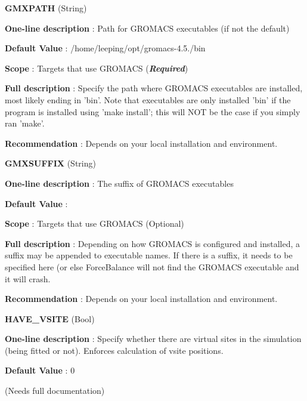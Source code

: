 \begin{DoxyItemize}
\item {\bfseries  \-G\-M\-X\-P\-A\-T\-H } (\-String) \par
{\bfseries  \-One-\/line description }\-: \-Path for \-G\-R\-O\-M\-A\-C\-S executables (if not the default) \par
{\bfseries  \-Default \-Value }\-: /home/leeping/opt/gromacs-\/4.5./bin \par
{\bfseries  \-Scope }\-: \-Targets that use \-G\-R\-O\-M\-A\-C\-S ({\bfseries {\itshape \-Required\/}}) \par
{\bfseries  \-Full description }\-: \-Specify the path where \-G\-R\-O\-M\-A\-C\-S executables are installed, most likely ending in 'bin'. \-Note that executables are only installed 'bin' if the program is installed using 'make install'; this will \-N\-O\-T be the case if you simply ran 'make'. \par
{\bfseries  \-Recommendation }\-: \-Depends on your local installation and environment.\end{DoxyItemize}
\begin{DoxyItemize}
\item {\bfseries  \-G\-M\-X\-S\-U\-F\-F\-I\-X } (\-String) \par
{\bfseries  \-One-\/line description }\-: \-The suffix of \-G\-R\-O\-M\-A\-C\-S executables \par
{\bfseries  \-Default \-Value }\-: \par
{\bfseries  \-Scope }\-: \-Targets that use \-G\-R\-O\-M\-A\-C\-S (\-Optional) \par
{\bfseries  \-Full description }\-: \-Depending on how \-G\-R\-O\-M\-A\-C\-S is configured and installed, a suffix may be appended to executable names. \-If there is a suffix, it needs to be specified here (or else \-Force\-Balance will not find the \-G\-R\-O\-M\-A\-C\-S executable and it will crash. \par
{\bfseries  \-Recommendation }\-: \-Depends on your local installation and environment.\end{DoxyItemize}
\begin{DoxyItemize}
\item {\bfseries  \-H\-A\-V\-E\-\_\-\-V\-S\-I\-T\-E } (\-Bool) \par
{\bfseries  \-One-\/line description }\-: \-Specify whether there are virtual sites in the simulation (being fitted or not). \-Enforces calculation of vsite positions. \par
{\bfseries  \-Default \-Value }\-: 0 \par
(\-Needs full documentation)\end{DoxyItemize}
